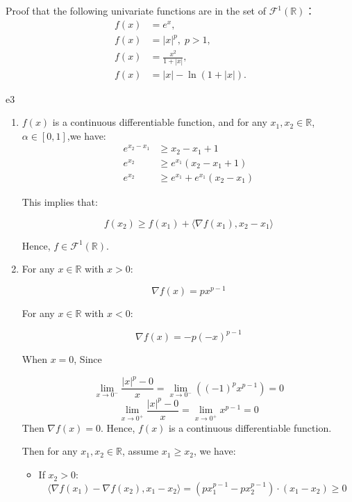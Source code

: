 \documentclass{article}
\newcommand{\RBB}{\mathbb{R}}
\begin{document}
\begin{excercise}\label{e3}
	Proof that the following univariate functions are in the set of $\mathcal{F}^1(\mathbb{R})$：
	\begin{align}
		f(x) &= e^x,\nonumber \\
		f(x) &= |x|^p,\; p > 1,\nonumber \\
		f(x) &= \frac{x^2}{1 + |x|},\nonumber \\
		f(x) &= |x| - \ln (1 + |x|).\nonumber
	\end{align}
\end{excercise}
\begin{PROOF}{e3}
\begin{enumerate}
	\item $f(x)$ is a continuous differentiable function, and for any $x_1, x_2 \in \RBB$, $\alpha \in [0, 1]$,we have:
	\begin{align*}
	e^{x_2 - x_1} &\geq x_2 - x_1 + 1 \\
	e^{x_2} &\geq e^{x_1} \left( x_2 - x_1 + 1 \right) \\
	e^{x_2} &\geq e^{x_1} + e^{x_1} \left( x_2 - x_1 \right)
	\end{align*}
	
	This implies that:
	
	\[ f(x_2) \geq f(x_1) + \langle \nabla f(x_1), x_2 - x_1 \rangle \]
	
	Hence, \( f \in \mathcal{F}^1(\mathbb{R}) \).
	\item For any \( x \in \mathbb{R} \) with \( x > 0 \):

	\[ \nabla f(x) = p x^{p-1} \]
	
	For any \( x \in \mathbb{R} \) with \( x < 0 \):
	
	\[ \nabla f(x) = -p (-x)^{p-1} \]
	
	When \( x = 0 \), Since
	
	\[ \lim_{x \to 0^-} \frac{|x|^p - 0}{x} = \lim_{x \to 0^-} \left( (-1)^p x^{p-1} \right) = 0 \]
	\[ \lim_{x \to 0^+} \frac{|x|^p - 0}{x} = \lim_{x \to 0^+} x^{p-1} = 0 \]
	Then $\nabla f(x) = 0$. Hence, $f(x)$ is a continuous differentiable function.

	Then for any \(x_{1},x_{2}\in\mathbb{R}\), assume \(x_{1}\geq x_{2}\), we have:

	\begin{itemize}
		\item If \(x_{2}>0\):
		\[
		\langle\nabla f\left(x_{1}\right)-\nabla f\left(x_{2}\right),x_{1}-x_{2} \rangle=\left(px_{1}^{p-1}-px_{2}^{p-1}\right)\cdot\left(x_{1}-x_{2}\right)\geq 0
		\]
		

\end{itemize}
\end{enumerate}
\end{PROOF}
\end{document}
